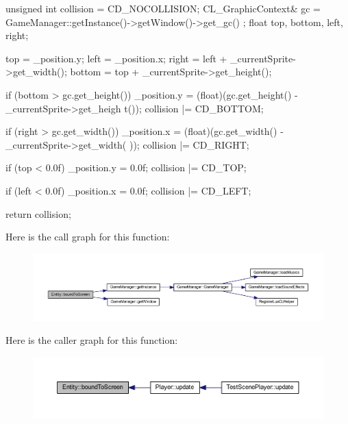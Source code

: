 \begin{DoxyCode}
{
        unsigned int collision = CD_NOCOLLISION;
        CL_GraphicContext& gc = GameManager::getInstance()->getWindow()->get_gc()
      ;
        float top, bottom, left, right;

        top = _position.y;
        left = _position.x;
        right = left + _currentSprite->get_width();
        bottom = top + _currentSprite->get_height();

        if (bottom > gc.get_height())
        {
                _position.y = (float)(gc.get_height() - _currentSprite->get_heigh
      t());
                collision |= CD_BOTTOM;
        } 
        
        if (right > gc.get_width())
        {
                _position.x = (float)(gc.get_width() - _currentSprite->get_width(
      ));
                collision |= CD_RIGHT;
        }
        
        if (top < 0.0f)
        {
                _position.y = 0.0f;
                collision |= CD_TOP;
        }
        
        if (left < 0.0f)
        {
                _position.x = 0.0f;
                collision |= CD_LEFT;
        }

        return collision;
}
\end{DoxyCode}


Here is the call graph for this function:
\nopagebreak
\begin{figure}[H]
\begin{center}
\leavevmode
\includegraphics[width=400pt]{d2/d96/class_entity_aef338be6e4f5f4c95edd5ff91098cd84_cgraph}
\end{center}
\end{figure}




Here is the caller graph for this function:
\nopagebreak
\begin{figure}[H]
\begin{center}
\leavevmode
\includegraphics[width=400pt]{d2/d96/class_entity_aef338be6e4f5f4c95edd5ff91098cd84_icgraph}
\end{center}
\end{figure}



